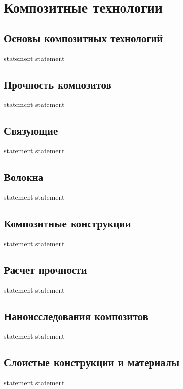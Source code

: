 \chapter{Композитные технологии}

\section{Основы композитных технологий}

{statement}
{statement}

\section{Прочность композитов}

{statement}
{statement}

\section{Связующие}

{statement}
{statement}

\section{Волокна}

{statement}
{statement}

\section{Композитные конструкции}

{statement}
{statement}

\section{Расчет прочности}

{statement}
{statement}

\section{Наноисследования композитов}

{statement}
{statement}

\section{Слоистые конструкции и материалы}

{statement}
{statement}